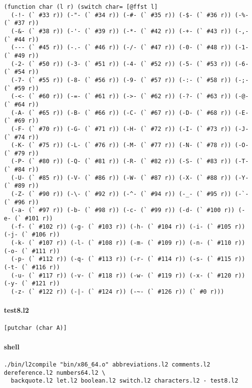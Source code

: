 \documentclass[]{article}
\let\oldparagraph\paragraph
\renewcommand{\paragraph}[1]{\oldparagraph{#1}\mbox{}}
\begin{document}
\begin{verbatim}
(function char (l r) (switch char= [@ffst l]
  (-!- (` #33 r)) (-"- (` #34 r)) (-#- (` #35 r)) (-$- (` #36 r)) (-%- (` #37 r))
  (-&- (` #38 r)) (-'- (` #39 r)) (-*- (` #42 r)) (-+- (` #43 r)) (-,- (` #44 r))
  (--- (` #45 r)) (-.- (` #46 r)) (-/- (` #47 r)) (-0- (` #48 r)) (-1- (` #49 r))
  (-2- (` #50 r)) (-3- (` #51 r)) (-4- (` #52 r)) (-5- (` #53 r)) (-6- (` #54 r))
  (-7- (` #55 r)) (-8- (` #56 r)) (-9- (` #57 r)) (-:- (` #58 r)) (-;- (` #59 r))
  (-<- (` #60 r)) (-=- (` #61 r)) (->- (` #62 r)) (-?- (` #63 r)) (-@- (` #64 r))
  (-A- (` #65 r)) (-B- (` #66 r)) (-C- (` #67 r)) (-D- (` #68 r)) (-E- (` #69 r))
  (-F- (` #70 r)) (-G- (` #71 r)) (-H- (` #72 r)) (-I- (` #73 r)) (-J- (` #74 r))
  (-K- (` #75 r)) (-L- (` #76 r)) (-M- (` #77 r)) (-N- (` #78 r)) (-O- (` #79 r))
  (-P- (` #80 r)) (-Q- (` #81 r)) (-R- (` #82 r)) (-S- (` #83 r)) (-T- (` #84 r))
  (-U- (` #85 r)) (-V- (` #86 r)) (-W- (` #87 r)) (-X- (` #88 r)) (-Y- (` #89 r))
  (-Z- (` #90 r)) (-\- (` #92 r)) (-^- (` #94 r)) (-_- (` #95 r)) (-`- (` #96 r))
  (-a- (` #97 r)) (-b- (` #98 r)) (-c- (` #99 r)) (-d- (` #100 r)) (-e- (` #101 r))
  (-f- (` #102 r)) (-g- (` #103 r)) (-h- (` #104 r)) (-i- (` #105 r)) (-j- (` #106 r))
  (-k- (` #107 r)) (-l- (` #108 r)) (-m- (` #109 r)) (-n- (` #110 r)) (-o- (` #111 r))
  (-p- (` #112 r)) (-q- (` #113 r)) (-r- (` #114 r)) (-s- (` #115 r)) (-t- (` #116 r))
  (-u- (` #117 r)) (-v- (` #118 r)) (-w- (` #119 r)) (-x- (` #120 r)) (-y- (` #121 r))
  (-z- (` #122 r)) (-|- (` #124 r)) (-~- (` #126 r)) (` #0 r)))
\end{verbatim}

\paragraph{test8.l2}\label{test8.l2}

\begin{verbatim}
[putchar (char A)]
\end{verbatim}

\paragraph{shell}\label{shell-7}

\begin{verbatim}
./bin/l2compile "bin/x86_64.o" abbreviations.l2 comments.l2 dereference.l2 numbers64.l2 \
  backquote.l2 let.l2 boolean.l2 switch.l2 characters.l2 - test8.l2
\end{verbatim}
\end{document}
